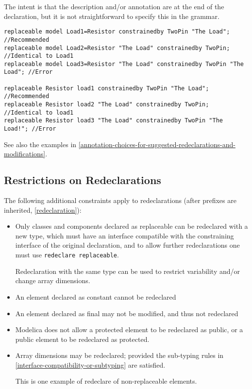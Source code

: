 \begin{nonnormative}
The intent is that the description and/or annotation are at the end of the declaration, but it is not straightforward to specify this in the grammar.
\end{nonnormative}

\begin{example}
\begin{lstlisting}[language=modelica]
replaceable model Load1=Resistor constrainedby TwoPin "The Load"; //Recommended
replaceable model Load2=Resistor "The Load" constrainedby TwoPin; //Identical to Load1
replaceable model Load3=Resistor "The Load" constrainedby TwoPin "The Load"; //Error

replaceable Resistor load1 constrainedby TwoPin "The Load"; //Recommended
replaceable Resistor load2 "The Load" constrainedby TwoPin; //Identical to load1
replaceable Resistor load3 "The Load" constrainedby TwoPin "The Load!"; //Error
\end{lstlisting}
\end{example}

See also the examples in \autoref{annotation-choices-for-suggested-redeclarations-and-modifications}.

\subsection{Restrictions on Redeclarations}

The following additional constraints apply to redeclarations (after
prefixes are inherited, \autoref{redeclaration}):
\begin{itemize}
\item
  Only classes and components declared as replaceable can be redeclared with a new type, which must have an interface compatible with the constraining
  interface of the original declaration, and to allow further redeclarations one must use \lstinline!redeclare replaceable!.
  \begin{nonnormative}
  Redeclaration with the same type can be used to restrict variability and/or change array dimensions.
  \end{nonnormative}
\item
  An element declared as constant cannot be redeclared
\item
  An element declared as final may not be modified, and thus not
  redeclared
\item
  Modelica does not allow a protected element to be redeclared as
  public, or a public element to be redeclared as protected.
\item
  Array dimensions may be redeclared; provided the sub-typing rules in
  \autoref{interface-compatibility-or-subtyping} are satisfied.
  \begin{nonnormative}
  This is one example of redeclare of non-replaceable elements.
  \end{nonnormative}
\end{itemize}

